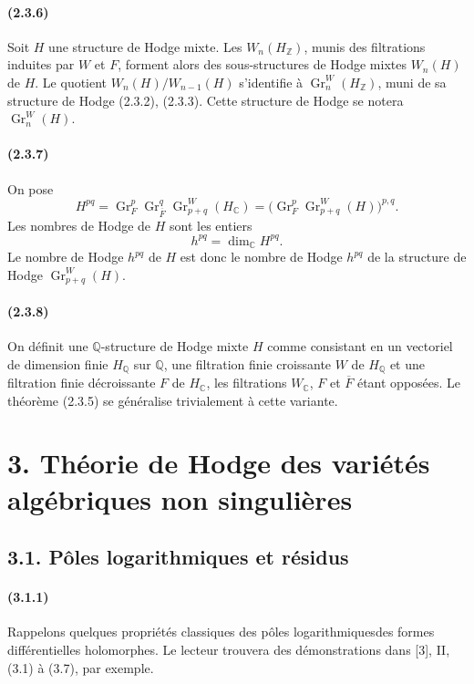 \documentclass[10pt]{article}
\newcommand{\C}{\mathbb C}
\newcommand{\Q}{\mathbb Q}
\newcommand{\Z}{\mathbb Z}
\newcommand{\Gr}{\operatorname{Gr}}
\newcommand{\fg}{\guillemotright}
\newcommand{\og}{\guillemotleft}
\begin{document}
\paragraph{(2.3.6)} Soit $H$ une structure de Hodge mixte. Les $W_n(H_\Z)$, munis des filtrations induites par $W$ et $F$, forment alors des sous-structures de Hodge mixtes $W_n(H)$ de $H$. Le quotient $W_n(H)/W_{n-1}(H)$ s'identifie à $\Gr_n^W(H_\Z)$, muni de sa structure de Hodge (2.3.2), (2.3.3). Cette structure de Hodge se notera $\Gr_n^W(H)$.

\paragraph{(2.3.7)} On pose
\[
H^{pq}=\Gr_F^p\Gr_{\overline F}^q\Gr_{p+q}^W(H_\C)
       =\bigl(\Gr_F^p\Gr_{p+q}^W(H)\bigr)^{p,q}.
\]
Les nombres de Hodge de $H$ sont les entiers
\[
h^{pq}=\dim_\C H^{pq}.
\]
Le nombre de Hodge $h^{pq}$ de $H$ est donc le nombre de Hodge $h^{pq}$ de la structure de Hodge $\Gr_{p+q}^W(H)$.

\paragraph{(2.3.8)} On définit une $\Q$-structure de Hodge mixte $H$ comme consistant en un vectoriel de dimension finie $H_\Q$ sur $\Q$, une filtration finie croissante $W$ de $H_\Q$ et une filtration finie décroissante $F$ de $H_\C$, les filtrations $W_\C$, $F$ et $\overline F$ étant opposées. Le théorème (2.3.5) se généralise trivialement à cette variante.

\section*{3. Théorie de Hodge des variétés algébriques non singulières}

\subsection*{3.1. Pôles logarithmiques et résidus}

\paragraph{(3.1.1)} Rappelons quelques propriétés classiques des \og pôles logarithmiques\fg des formes différentielles holomorphes. Le lecteur trouvera des démonstrations dans [3], II, (3.1) à (3.7), par exemple.
\end{document}
